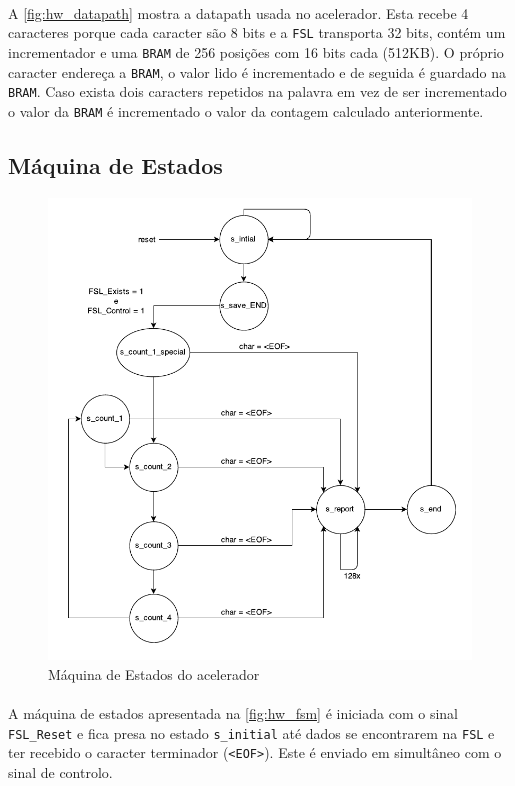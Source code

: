   \paragraph{} A \autoref{fig:hw_datapath} mostra a datapath usada no acelerador. Esta recebe 4 caracteres porque cada caracter são 8 bits e a \texttt{FSL} transporta 32 bits, contém um incrementador e uma \texttt{BRAM} de 256 posições com 16 bits cada (512KB). O próprio caracter endereça a \texttt{BRAM}, o valor lido é incrementado e de seguida é guardado na \texttt{BRAM}. Caso exista dois caracters repetidos na palavra em vez de ser incrementado o valor da \texttt{BRAM} é incrementado o valor da contagem calculado anteriormente.

\subsection{Máquina de Estados}
  \begin{figure}[H]
    \centering
    \includegraphics[width=1.0\textwidth]{img/fsm}
    \caption{Máquina de Estados do acelerador}
    \label{fig:hw_fsm}
  \end{figure}

  \paragraph{} A máquina de estados apresentada na \autoref{fig:hw_fsm} é iniciada com o sinal \texttt{FSL\_Reset} e fica presa no estado \texttt{s\_initial} até dados se encontrarem na \texttt{FSL} e ter recebido o caracter terminador (\texttt{<EOF>}). Este é enviado em simultâneo com o sinal de controlo.

